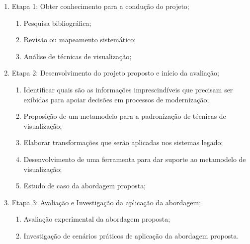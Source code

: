 \documentclass[12pt]{article}
\begin{document}
\begin{enumerate}
\item Etapa 1: Obter conhecimento para a condução do projeto;
    
    \begin{enumerate}
    \item Pesquisa bibliográfica;
    \item Revisão ou mapeamento sistemático;
    \item Análise de técnicas de visualização;
    \end{enumerate}

\item Etapa 2: Desenvolvimento do projeto proposto e início da avaliação;

    \begin{enumerate}
    \item Identificar quais são as informações imprescindíveis que precisam ser exibidas para apoiar decisões em processos de modernização;
    \item Proposição de um metamodelo para a padronização de técnicas de visualização;
    \item Elaborar transformações que serão aplicadas nos sistemas legado;
    \item Desenvolvimento de uma ferramenta para dar suporte ao metamodelo de visualização;
    \item Estudo de caso da abordagem proposta;
    \end{enumerate}
    
\item Etapa 3: Avaliação e Investigação da aplicação da abordagem;

    \begin{enumerate}
    \item Avaliação experimental da abordagem proposta;
    \item Investigação de cenários práticos de aplicação da abordagem proposta.
    \end{enumerate}

\end{enumerate}
\end{document}
